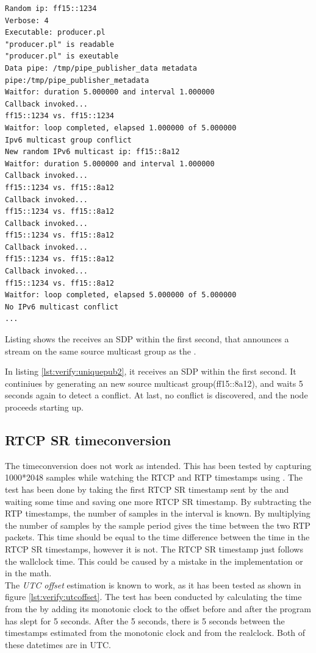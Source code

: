 \begin{listing}[H] 
\begin{verbatim}
Random ip: ff15::1234
Verbose: 4
Executable: producer.pl
"producer.pl" is readable
"producer.pl" is exeutable
Data pipe: /tmp/pipe_publisher_data metadata pipe:/tmp/pipe_publisher_metadata
Waitfor: duration 5.000000 and interval 1.000000
Callback invoked...
ff15::1234 vs. ff15::1234
Waitfor: loop completed, elapsed 1.000000 of 5.000000
Ipv6 multicast group conflict
New random IPv6 multicast ip: ff15::8a12
Waitfor: duration 5.000000 and interval 1.000000
Callback invoked...
ff15::1234 vs. ff15::8a12
Callback invoked...
ff15::1234 vs. ff15::8a12
Callback invoked...
ff15::1234 vs. ff15::8a12
Callback invoked...
ff15::1234 vs. ff15::8a12
Callback invoked...
ff15::1234 vs. ff15::8a12
Waitfor: loop completed, elapsed 5.000000 of 5.000000
No IPv6 multicast conflict
...
\end{verbatim}
\caption{Listing shows the \pub{} receives an SDP within the first second, that announces a stream on the same source multicast group as the \pub{}. }
\label{lst:verify:uniquepub2}
\end{listing}

In listing \ref{lst:verify:uniquepub2}, it receives an SDP within the first second. It continiues by generating an new source multicast group(ff15::8a12), and waits 5 seconds again to detect a conflict. At last, no conflict is discovered, and the node proceeds starting up.


\subsection{RTCP SR timeconversion}\label{sec:verify:rtcpsr}
The timeconversion does not work as intended. This has been tested by capturing 1000*2048 samples while watching the RTCP and RTP timestamps using .  The test has been done by taking the first RTCP SR timestamp sent by the \pub{} and waiting some time and saving one more RTCP SR timestamp. By subtracting the RTP timestamps, the number of samples in the interval is known. By multiplying the number of samples by the sample period gives the time between the two RTP packets. This time should be equal to the time difference between the time in the RTCP SR timestamps, however it is not. The RTCP SR timestamp just follows the wallclock time. This could be caused by a mistake in the implementation or in the math.\\

\noindent{}The \textit{UTC offset} estimation is known to work, as it has been tested as shown in figure \ref{lst:verify:utcoffset}. The test has been conducted by calculating the time from the  by adding its monotonic clock to the offset before and after the program has slept for 5 seconds. After the 5 seconds, there is 5 seconds between the timestamps estimated from the monotonic clock and from the realclock.  Both of these datetimes are in UTC.

